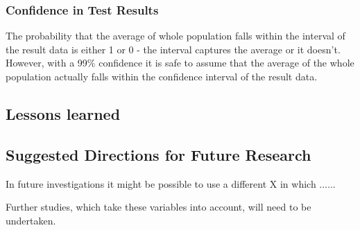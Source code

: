  \subsubsection{Confidence in Test Results}
The probability that the average of whole population falls within the interval of the result data is either 1 or 0 - the interval captures the average or it doesn't\cite{gunnar}. However, with a 99\% confidence it is safe to assume that the average of the whole population actually falls within the confidence interval of the result data. 


\subsection{Lessons learned}
\subsection{Suggested Directions for Future Research}

In future investigations it might be possible to use a different X in which ...... 

Further studies, which take these variables into account, will need to be undertaken.
